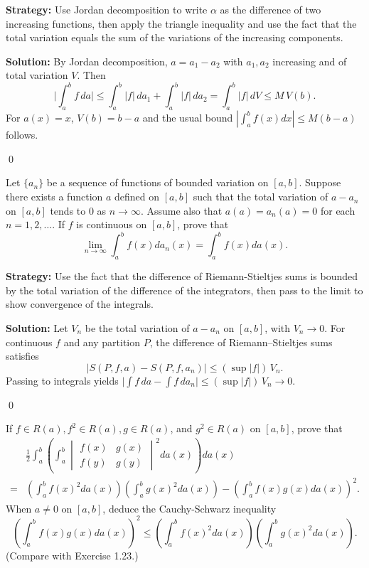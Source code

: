 \noindent\textbf{Strategy:} Use Jordan decomposition to write $\alpha$ as the difference of two increasing functions, then apply the triangle inequality and use the fact that the total variation equals the sum of the variations of the increasing components.

\bigskip\noindent\textbf{Solution:}
By Jordan decomposition, $a=a_1-a_2$ with $a_1,a_2$ increasing and of total variation $V$. Then
\[\Big|\int_a^b f\,da\Big|\le \int_a^b |f|\,da_1+\int_a^b |f|\,da_2=\int_a^b |f|\,dV\le M\,V(b).
\]
For $a(x)=x$, $V(b)=b-a$ and the usual bound $|\int_a^b f(x)dx|\le M(b-a)$ follows.




\qed
\begin{problembox}
\begin{problemstatement}
Let $\{a_n\}$ be a sequence of functions of bounded variation on $[a, b]$. Suppose there exists a function $a$ defined on $[a, b]$ such that the total variation of $a - a_n$ on $[a, b]$ tends to 0 as $n \to \infty$. Assume also that $a(a) = a_n(a) = 0$ for each $n = 1, 2, \ldots$. If $f$ is continuous on $[a, b]$, prove that
\[\lim_{n \to \infty} \int_a^b f(x) da_n(x) = \int_a^b f(x) da(x).\]
\end{problemstatement}
\end{problembox}

\noindent\textbf{Strategy:} Use the fact that the difference of Riemann-Stieltjes sums is bounded by the total variation of the difference of the integrators, then pass to the limit to show convergence of the integrals.

\bigskip\noindent\textbf{Solution:}
Let $V_n$ be the total variation of $a-a_n$ on $[a,b]$, with $V_n\to0$. For continuous $f$ and any partition $P$, the difference of Riemann–Stieltjes sums satisfies
\[|S(P,f,a)-S(P,f,a_n)|\le (\sup|f|)\,V_n.
\]
Passing to integrals yields $\big|\int f\,da-\int f\,da_n\big|\le (\sup|f|)\,V_n\to0$.




\qed
\begin{problembox}
\begin{problemstatement}
If $f \in R(a), f^2 \in R(a), g \in R(a)$, and $g^2 \in R(a)$ on $[a, b]$, prove that
\begin{align*}
&\frac{1}{2} \int_a^b \left( \int_a^b \begin{vmatrix} f(x) & g(x) \\ f(y) & g(y) \end{vmatrix}^2 da(x) \right) da(x) \\
=& \left( \int_a^b f(x)^2 da(x) \right) \left( \int_a^b g(x)^2 da(x) \right) - \left( \int_a^b f(x)g(x) da(x) \right)^2.
\end{align*}
When $a \neq 0$ on $[a, b]$, deduce the Cauchy-Schwarz inequality
\[\left( \int_a^b f(x)g(x) da(x) \right)^2 \leq \left( \int_a^b f(x)^2 da(x) \right) \left( \int_a^b g(x)^2 da(x) \right).\]
(Compare with Exercise 1.23.)
\end{problemstatement}
\end{problembox}

